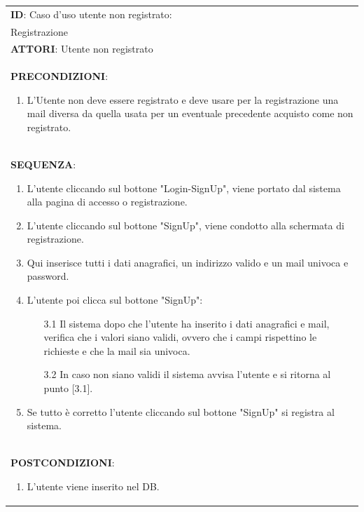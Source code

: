 \documentclass[a4paper,11pt]{report}
\begin{document}
  \begin{table}[h!]
    \renewcommand*{\arraystretch}{1.2}
    \centering
    \begin{tabularx}{\textwidth}{|X|} \hline
      \textbf{ID}: Caso d'uso utente non registrato: \\Registrazione\\
      \hline
      \textbf{ATTORI}: Utente non registrato \\
      \hline
      \textbf{PRECONDIZIONI}:
      \begin{enumerate}
        \item L'Utente non deve essere registrato e deve usare per la registrazione una mail diversa da quella usata per un eventuale precedente acquisto come non registrato.
      \end{enumerate} \\
      \hline
      \textbf{SEQUENZA}:
      \begin{enumerate}
        \item L'utente cliccando sul bottone "Login-SignUp", viene portato dal sistema alla pagina di accesso o registrazione.
        \newline
        \item L'utente cliccando sul bottone "SignUp", viene condotto alla schermata di registrazione.
        \newline
        \item Qui inserisce tutti i dati anagrafici, un indirizzo valido e un mail univoca e password.
        \newline
        \item L'utente poi clicca sul bottone "SignUp":
        \begin{enumerate}
            \item [3.1] Il sistema dopo che l'utente ha inserito i dati anagrafici e mail, verifica che i valori siano validi, ovvero che i campi rispettino le richieste e che la mail sia univoca. 
            \newline
            \item [3.2] In caso non siano validi il sistema avvisa l'utente e si ritorna al punto [3.1].
        \end{enumerate}
        \item Se tutto è corretto l'utente cliccando sul bottone "SignUp" si registra al sistema.
      \end{enumerate} \\
      \hline
      \textbf{POSTCONDIZIONI}:
      \begin{enumerate}
        \item L'utente viene inserito nel DB.
      \end{enumerate} \\
      \hline
    \end{tabularx}
  \end{table}
  
\end{document}
